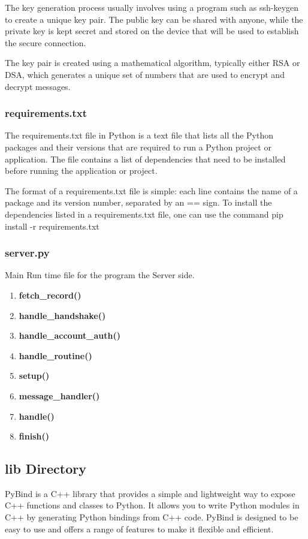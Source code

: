 \documentclass{article}
\begin{document}
The key generation process usually involves using a program such as ssh-keygen to create a unique key pair.
The public key can be shared with anyone, while the private key is kept secret and stored on the device that will be used to establish the secure connection.

The key pair is created using a mathematical algorithm, typically either RSA or DSA, which generates a unique set of numbers that are used to encrypt and decrypt messages.

\subsubsection{requirements.txt}
The requirements.txt file in Python is a text file that lists all the Python packages and their versions that are required
to run a Python project or application.
The file contains a list of dependencies that need to be installed before running the application or project.

The format of a requirements.txt file is simple: each line contains the name of a package and its version number, separated by an == sign.
To install the dependencies listed in a requirements.txt file, one can use the command pip install -r requirements.txt

\subsubsection{server.py}
Main Run time file for the program the Server side.
\begin{enumerate}
    \item \textbf{fetch\_record()}
    \item \textbf{handle\_handshake()}
    \item \textbf{handle\_account\_auth()}
    \item \textbf{handle\_routine()}
    \item \textbf{setup()}
    \item \textbf{message\_handler()}
    \item \textbf{handle()}
    \item \textbf{finish()}
\end{enumerate}

\newpage
\subsection{lib Directory}
PyBind is a C++ library that provides a simple and lightweight way to expose C++ functions and classes to Python.
It allows you to write Python modules in C++ by generating Python bindings from C++ code.
PyBind is designed to be easy to use and offers a range of features to make it flexible and efficient.
\end{document}
